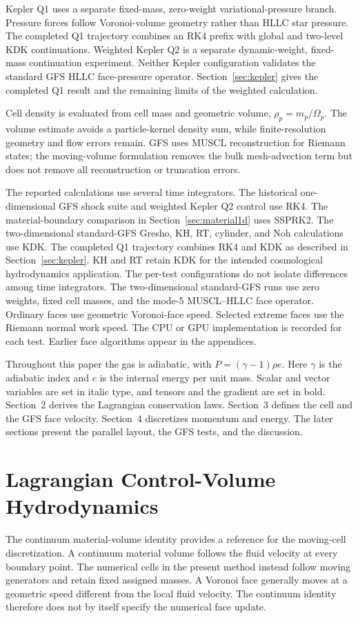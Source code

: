 \documentclass[twocolumn]{aastex63}
\begin{document}
Kepler Q1 uses a separate fixed-mass, zero-weight variational-pressure
branch. Pressure forces follow Voronoi-volume geometry rather than HLLC
star pressure. The completed Q1 trajectory combines an RK4 prefix with
global and two-level KDK continuations. Weighted Kepler Q2 is a separate
dynamic-weight, fixed-mass continuation experiment. Neither Kepler
configuration validates the standard GFS HLLC face-pressure operator.
Section~\ref{sec:kepler} gives the completed Q1 result and the remaining
limits of the weighted calculation.

Cell density is evaluated from cell mass and geometric volume,
$\rho_p=m_p/\Omega_p$. The volume estimate avoids a particle-kernel density
sum, while finite-resolution geometry and flow errors remain. GFS uses MUSCL
reconstruction for Riemann states; the moving-volume formulation removes the
bulk mesh-advection term but does not remove all reconstruction or
truncation errors.

The reported calculations use several time integrators. The historical one-dimensional GFS
shock suite and weighted Kepler Q2 control use RK4. The material-boundary
comparison in Section~\ref{sec:material1d} uses SSPRK2. The two-dimensional
standard-GFS Gresho, KH, RT, cylinder, and Noh calculations use KDK.
The completed Q1 trajectory combines RK4 and KDK as described in
Section~\ref{sec:kepler}. KH and RT retain KDK for the intended cosmological
hydrodynamics application. The per-test configurations do not isolate
differences among time integrators. The two-dimensional standard-GFS runs
use zero weights, fixed cell masses, and the mode-5 MUSCL--HLLC face operator.
Ordinary faces use geometric Voronoi-face speed. Selected extreme faces
use the Riemann normal work speed. The CPU or GPU implementation is
recorded for each test. Earlier face algorithms appear in the appendices.

Throughout this paper the gas is adiabatic, with $P = (\gamma-1)\rho e$.
Here $\gamma$ is the adiabatic index and $e$ is the internal energy per unit mass.
Scalar and vector variables are set in italic type, and tensors and the gradient are set in bold.
Section~2 derives the Lagrangian conservation laws.
Section~3 defines the cell and the GFS face velocity.
Section~4 discretizes momentum and energy.
The later sections present the parallel layout, the GFS tests, and the discussion.

\section{Lagrangian Control-Volume Hydrodynamics}
The continuum material-volume identity provides a reference for the
moving-cell discretization. A continuum material volume follows the fluid
velocity at every boundary point. The numerical cells in the present method
instead follow moving generators and retain fixed assigned masses. A Voronoi
face generally moves at a geometric speed different from the local fluid
velocity. The continuum identity therefore does not by itself specify the
numerical face update.
\end{document}

